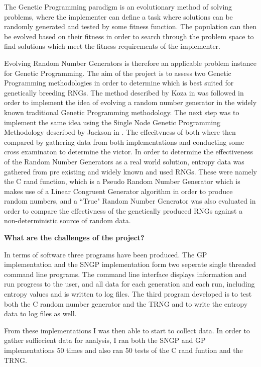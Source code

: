 \documentclass[a4paper,10.5pt]{article}
\begin{document}
The Genetic Programming paradigm is an evolutionary method of solving problems, where the implementer can define a task where solutions can be randomly generated and tested by some fitness function. The population can then be evolved based on their fitness in order to search through the problem space to find solutions which meet the fitness requirements of the implementer.

Evolving Random Number Generators is therefore an applicable problem instance for Genetic Programming.  The aim of the project is to assess two Genetic Programming methodologies in order to determine which is best suited for genetically breeding RNGs. The method described by Koza in \cite{koza} was followed in order to implement the idea of evolving a random number generator in the widely known traditional Genetic Programming methodology. The next step was to implement the same idea using the Single Node Genetic Programming Methodology described by Jackson in \cite{jacksonsngp}. The effecitvness of both where then compared by gathering data from both implementations and conducting some cross examinaton to determine the victor. In order to determine the effectiveness of the Random Number Generators as a real world solution, entropy data was gathered from pre existing and widely known and used RNGs. These were namely the C rand function, which is a Pseudo Random Number Generator which is makes use of a Linear Congruent Generator algorithm in order to produce random numbers, and a ``True" Random Number Generator was also evaluated in order to compare the effectivness of the genetically produced RNGs against a non-deterministic source of random data. 

\textbf{What are the challenges of the project?}


In terms of software three programs have been produced. The GP implementation and the SNGP implementation form two seperate single threaded command line programs. The command line interface displays information and run progress to the user, and all data for each generation and each run, including entropy values and is written to log files. 
The third program developed is to test both the C random number generator and the TRNG and to write the entropy data to log files as well.

From these implementations I was then able to start to collect data. In order to gather suffiecient data for analysis, I ran both the SNGP and GP implementations 50 times and also ran 50 tests of the C rand funtion and the TRNG. 
\end{document}
